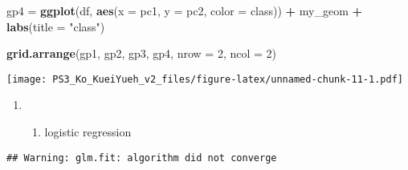 \documentclass[]{article}
\newenvironment{Shaded}{\begin{snugshade}}{\end{snugshade}}
\newcommand{\KeywordTok}[1]{\textcolor[rgb]{0.13,0.29,0.53}{\textbf{#1}}}
\newcommand{\DataTypeTok}[1]{\textcolor[rgb]{0.13,0.29,0.53}{#1}}
\newcommand{\DecValTok}[1]{\textcolor[rgb]{0.00,0.00,0.81}{#1}}
\newcommand{\StringTok}[1]{\textcolor[rgb]{0.31,0.60,0.02}{#1}}
\newcommand{\OperatorTok}[1]{\textcolor[rgb]{0.81,0.36,0.00}{\textbf{#1}}}
\newcommand{\NormalTok}[1]{#1}
\providecommand{\tightlist}{%
  \setlength{\itemsep}{0pt}\setlength{\parskip}{0pt}}
\begin{document}
\begin{Shaded}
\begin{Highlighting}[]
\NormalTok{gp4 =}\StringTok{ }\KeywordTok{ggplot}\NormalTok{(df, }\KeywordTok{aes}\NormalTok{(}\DataTypeTok{x =}\NormalTok{ pc1, }\DataTypeTok{y =}\NormalTok{ pc2, }\DataTypeTok{color =}\NormalTok{ class)) }\OperatorTok{+}\StringTok{ }
\StringTok{    }\NormalTok{my_geom }\OperatorTok{+}
\StringTok{    }\KeywordTok{labs}\NormalTok{(}\DataTypeTok{title =} \StringTok{"class"}\NormalTok{)}

\KeywordTok{grid.arrange}\NormalTok{(gp1, gp2, gp3, gp4, }\DataTypeTok{nrow =} \DecValTok{2}\NormalTok{, }\DataTypeTok{ncol =} \DecValTok{2}\NormalTok{)}
\end{Highlighting}
\end{Shaded}

\texttt{[image: PS3\_Ko\_KueiYueh\_v2\_files/figure-latex/unnamed-chunk-11-1.pdf]}

\begin{enumerate}
\def\labelenumi{(\alph{enumi})}
\setcounter{enumi}{3}
\item
  \begin{enumerate}
  \def\labelenumii{\roman{enumii}.}
  \tightlist
  \item
    logistic regression
  \end{enumerate}
\end{enumerate}

\begin{Shaded}
\end{Shaded}

\begin{verbatim}
## Warning: glm.fit: algorithm did not converge
\end{verbatim}
\end{document}
